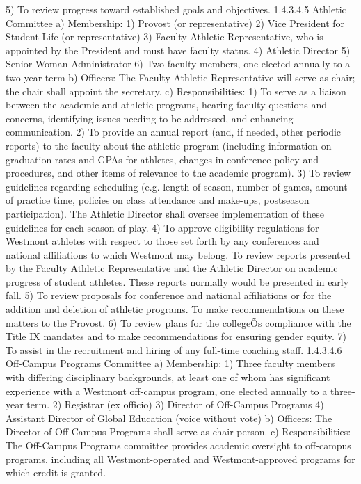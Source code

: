 \documentclass[letterpaper, 11pt]{article}
\begin{document}
				5) To review progress toward established goals and objectives.
				1.4.3.4.5 Athletic Committee
				a) Membership:
				1) Provost (or representative)
				2) Vice President for Student Life (or representative)
				3) Faculty Athletic Representative, who is appointed by the President and must have faculty status.
				4) Athletic Director
				5) Senior Woman Administrator
				6) Two faculty members, one elected annually to a two-year term
				b) Officers:
				The Faculty Athletic Representative will serve as chair; the chair shall appoint the secretary.
				c) Responsibilities:
				1) To serve as a liaison between the academic and athletic programs, hearing faculty questions and concerns, identifying issues needing to be addressed, and enhancing communication.
				2) To provide an annual report (and, if needed, other periodic reports) to the faculty about the athletic program (including information on graduation rates and GPAs for athletes, changes in conference policy and procedures, and other items of relevance to the academic program).
				3) To review guidelines regarding scheduling (e.g. length of season, number of games, amount of practice time, policies on class attendance and make-ups, postseason participation).  The Athletic Director shall oversee implementation of these guidelines for each season of play.
				4) To approve eligibility regulations for Westmont athletes with respect to those set forth by any conferences and national affiliations to which Westmont may belong.  To review reports presented by the Faculty Athletic Representative and the Athletic Director on academic progress of student athletes.  These reports normally would be presented in early fall.
				5) To review proposals for conference and national affiliations or for the addition and deletion of athletic programs.  To make recommendations on these matters to the Provost.
				6) To review plans for the collegeÕs compliance with the Title IX mandates and to make recommendations for ensuring gender equity.
				7) To assist in the recruitment and hiring of any full-time coaching staff.
				1.4.3.4.6 Off-Campus Programs Committee
				a) Membership:
				1) Three faculty members with differing disciplinary backgrounds, at least one of whom has significant experience with a Westmont off-campus program, one elected annually to a three-year term.
				2)  Registrar (ex officio)
				3) Director of Off-Campus Programs
				4) Assistant Director of Global Education (voice without vote)
				b) Officers:
				The Director of Off-Campus Programs shall serve as chair person.
				c) Responsibilities: The Off-Campus Programs committee provides academic oversight to off-campus programs, including all Westmont-operated and Westmont-approved programs for which credit is granted.
\end{document}
